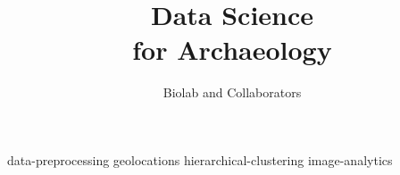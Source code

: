 \documentclass[symmetric, justified, a4paper]{tufte-book}
\title{Data Science \protect\\ for Archaeology}
\author[Biolab and Collaborators]{Biolab and Collaborators}
\begin{document}
\frontmatter

\maketitle



\tableofcontents

\mainmatter




{data-preprocessing}
{geolocations}
{hierarchical-clustering}
{image-analytics}




% 



% 
% 





\backmatter



\end{document}
